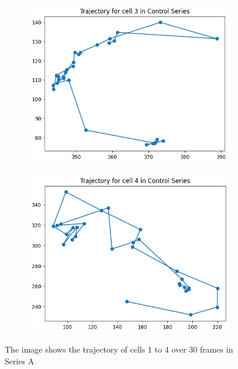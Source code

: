 \documentclass{article}
\begin{document}
\begin{figure}[h!]
\begin{subfigure}[b]{0.5\linewidth}
        \caption{}
    \end{subfigure}
    \begin{subfigure}[b]{0.5\linewidth}
        \centering
        \includegraphics[width=\linewidth]{Report/Appendix_Images/Trajectory-A-Control/trajectory_3.png}
        \caption{}
    \end{subfigure}%
    \begin{subfigure}[b]{0.5\linewidth}
        \centering
        \includegraphics[width=\linewidth]{Report/Appendix_Images/Trajectory-A-Control/trajectory_4.png}
        \caption{}
    \end{subfigure}
    \caption{The image shows the trajectory of cells 1 to 4 over 30 frames in Series A}
    \label{fig:ChoiceofCells-ControlSeries}
\end{figure}
\end{document}
